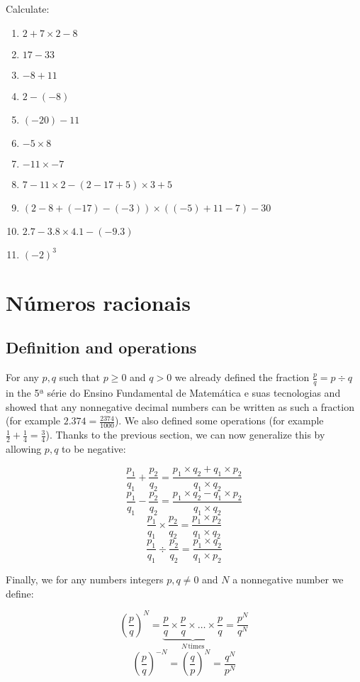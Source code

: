 Calculate:

\begin{enumerate}
\item $2 + 7\times2 - 8$
\item $17-33$
\item $-8+11$
\item $2 - {(-8)}$
\item ${(-20)} - 11$
\item $-5 \times 8$
\item $-11 \times -7$
\item $7 - 11\times2 - \left(2-17+5\right) \times 3 + 5$
\item $\left( 2 - 8 + {(-17)} - {(-3)} \right) \times
  \left( {(-5)} + 11 - 7 \right) - 30$
\item $2.7 - 3.8 \times 4.1 - {(-9.3)}$
\item ${(-2)}^3$
\end{enumerate}

\section{Números racionais}

\subsection*{Definition and operations}

For any $p, q$ such that $p \geq 0$ and $q > 0$ we already
defined the fraction $\frac{p}{q} = p \div q$
in the 5ª série do Ensino Fundamental de Matemática e suas tecnologias and
showed that any nonnegative decimal numbers can be written as such a fraction
(for example $2.374 = \frac{2374}{1000}$). We also defined some operations
(for example $\frac{1}{2} + \frac{1}{4} = \frac{3}{4}$).
Thanks to the previous section,
we can now generalize this by allowing $p,q$ to be negative:

$$\frac{p_1}{q_1} + \frac{p_2}{q_2} = \frac{p_1 \times q_2 + q_1 \times p_2}{q_1 \times q_2}$$
$$\frac{p_1}{q_1} - \frac{p_2}{q_2} = \frac{p_1 \times q_2 - q_1 \times p_2}{q_1 \times q_2}$$
$$\frac{p_1}{q_1} \times \frac{p_2}{q_2} = \frac{p_1 \times p_2}{q_1 \times q_2}$$
$$\frac{p_1}{q_1} \div \frac{p_2}{q_2} = \frac{p_1 \times q_2}{q_1 \times p_2}$$

Finally, we for any numbers integers $p,q \neq 0$ and $N$ a nonnegative
number we define:

$$\left(\frac{p}{q}\right)^N =
\underset{N\,\text{times}}{\underbrace{\frac{p}{q} \times \frac{p}{q} \times
    \ldots \times \frac{p}{q}}} = \frac{p^N}{q^N}$$
$$\left(\frac{p}{q}\right)^{-N} =
\left(\frac{q}{p}\right)^{N} = \frac{q^N}{p^N}$$

